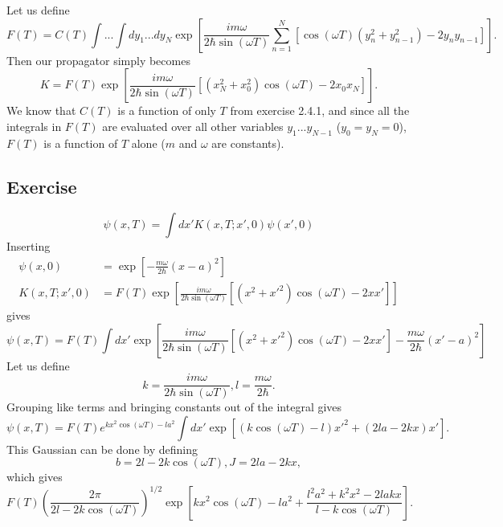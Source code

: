 Let us define 
\begin{equation}
    F(T)=C(T)\int...\int dy_1...dy_N\exp[\frac{i m\omega}{2\hbar\sin(\omega T)}\sum_{n=1}^N[\cos(\omega T)(y_n^2+y_{n-1}^2)-2y_ny_{n-1}]].
\end{equation}
Then our propagator simply becomes
\begin{equation}
    K=F(T)\exp[\frac{i m \omega}{2\hbar\sin(\omega T)}[(x_N^2+x_0^2)\cos(\omega T)-2x_0x_N]].
\end{equation}
We know that $C(T)$ is a function of only $T$ from exercise 2.4.1, and since all the integrals in $F(T)$ are evaluated over all other variables $y_1...y_{N-1}$ ($y_0=y_N=0$), $F(T)$ is a function of $T$ alone ($m$ and $\omega$ are constants). 


\subsection{Exercise}
\begin{equation}
    \psi(x,T)=\int dx' K(x,T; x', 0) \psi(x',0)
\end{equation}
Inserting 
\begin{align}
    \psi(x,0)&=\exp[-\frac{m\omega}{2\hbar}(x-a)^2]\\
    K(x,T; x', 0)& =F(T)\exp[\frac{i m \omega}{2\hbar\sin(\omega T)}[(x^2+x'^2)\cos(\omega T)-2xx']]
\end{align}
gives 
\begin{equation}
    \psi(x,T)=F(T)\int dx' \exp[\frac{i m \omega}{2\hbar\sin(\omega T)}[(x^2+x'^2)\cos(\omega T)-2xx']-\frac{m\omega}{2\hbar}(x'-a)^2]
\end{equation}
Let us define
\begin{equation}
    k=\frac{im\omega}{2 \hbar \sin(\omega T)}, l=\frac{m\omega}{2\hbar}.
\end{equation}
Grouping like terms and bringing constants out of the integral gives
\begin{equation}
    \psi(x,T)=F(T)e^{kx^2\cos(\omega T)-la^2}\int dx'\exp[(k\cos(\omega T)-l)x'^2+(2la-2kx)x'].
\end{equation}
This Gaussian can be done by defining
\begin{equation}
    b=2l-2k\cos(\omega T), J=2la-2kx,
\end{equation}
which gives
\begin{equation}
    F(T)\left (\frac{2\pi}{2l-2k\cos(\omega T)} \right )^{1/2}\exp[kx^2\cos(\omega T)-la^2+\frac{l^2a^2+k^2x^2-2lakx}{l-k\cos(\omega T)}].
\end{equation}
